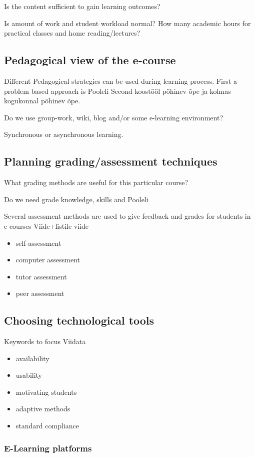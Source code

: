 Is the content sufficient to gain learning outcomes?

Is amount of work and student workload normal? How many academic hours for practical classes and home reading/lectures?

\subsection{Pedagogical view of the e-course}
Different Pedagogical strategies can be used during learning process. First a problem based approach is {\color{red} Pooleli }
Second koostööl põhinev õpe ja kolmas kogukonnal põhinev õpe.

Do we use group-work, wiki, blog and/or some e-learning environment?

Synchronous or asynchronous learning.

\subsection{Planning grading/assessment techniques}
What grading methods are useful for this particular course?

Do we need grade knowledge, skills and {\color{red} Pooleli }

Several assessment methods are used to give feedback and grades for students in e-courses {\color{red} Viide+listile viide }

\begin{itemize}
	\item self-assessment
	\item computer assessment
	\item tutor assessment
	\item peer assessment
\end{itemize}
\subsection{Choosing technological tools}
Keywords to focus {\color{red} Viidata }
\begin{itemize}
	\item availability
	\item usability 
	\item motivating students
	\item adaptive methods
	\item standard compliance
\end{itemize}
\subsubsection{E-Learning platforms}


